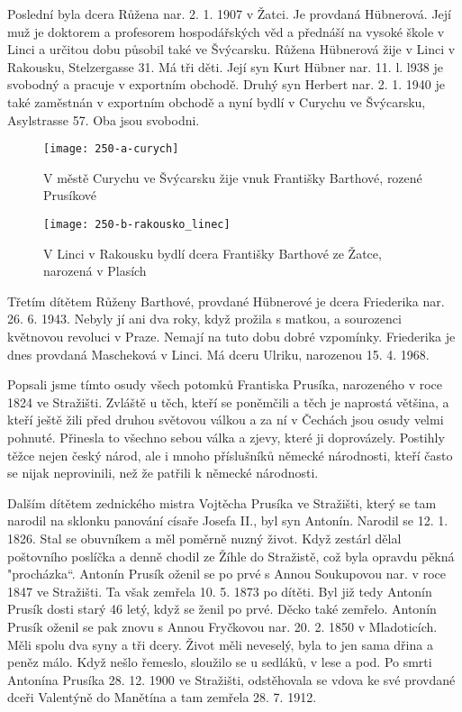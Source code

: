 \documentclass[../dejiny-rodu-prusiku.tex]{subfiles}
\begin{document}
Poslední byla dcera Růžena nar. 2. 1. 1907 v Žatci. Je provdaná Hübnerová. Její muž je doktorem a profesorem hospo­dářských věd a přednáší na vysoké škole v Linci a určitou dobu působil také ve Švýcarsku. Růžena Hübnerová žije v Linci v Rakousku, Stelzergasse 31. Má tři děti. Její syn Kurt Hübner nar. 11. l. l938 je svobodný a pracuje v exportním obchodě. Druhý syn Herbert nar. 2. 1. 1940 je také za­městnán v exportním obchodě a nyní bydlí v Curychu ve Švýcarsku, Asylstrasse 57. Oba jsou svobodni.

\begin{figure}
\centering
\texttt{[image: 250-a-curych]}
\caption{ V městě Curychu ve Švýcarsku žije vnuk Františky Barthové, rozené Prusíkové}
\label{fig:250-a-curych}
\end{figure}

             \begin{figure}
\centering
\texttt{[image: 250-b-rakousko\_linec]}
\caption{V Linci v Rakousku bydlí dcera Františky Barthové ze Žatce, narozená v Plasích}
\label{fig:250-b-rakousko_linec}
\end{figure}

Třetím dítětem Růženy Barthové, provdané Hübnerové je dcera Friederika nar. 26. 6. 1943. Nebyly jí ani dva roky, když prožila s matkou, a sourozenci květnovou revoluci v Praze. Nemají na tuto dobu dobré vzpomínky. Friederika je dnes provdaná Mascheková v Linci. Má dceru Ulriku, narozenou 15. 4. 1968.

Popsali jsme tímto osudy všech potomků Frantiska Prusíka, narozeného v roce 1824 ve Stražišti. Zvláště u těch, kteří se poněmčili a těch je naprostá většina, a kteří ještě žili před druhou světovou válkou a za ní v Čechách jsou osudy velmi pohnuté. Přinesla to všechno sebou válka a zjevy, které ji doprovázely. Postihly těžce nejen český národ, ale i mnoho příslušníků německé národnosti, kteří často se nijak neprovinili, než že patřili k německé národnosti.

Dalším dítětem zednického mistra Vojtěcha Prusíka ve Stražišti, který se tam narodil na sklonku panování císaře Josefa II., byl syn Antonín. Narodil se 12. 1. 1826. Stal se obuvníkem a měl poměrně nuzný život. Když zestárl dělal poštovního poslíčka a denně chodil ze Žíhle do Stražistě, což byla opravdu pěkná "procházka“. Antonín Prusík oženil se po prvé s Annou Soukupovou nar. v roce 1847 ve Stražišti. Ta však zemřela 10. 5. 1873 po dítěti. Byl již tedy Antonín Prusík dosti starý 46 letý, když se ženil po prvé. Děcko také zemřelo. Antonín Prusík oženil se pak znovu s Annou Fryčkovou nar. 20. 2. 1850 v Mladoticích. Měli spolu dva syny a tři dcery. Život měli neveselý, byla to jen sama dřina a peněz málo. Když nešlo řemeslo, sloužilo se u sedláků, v lese a pod. Po smrti Antonína Prusíka 28. 12. 1900 ve Stražišti, odstěhovala se vdova ke své provdané dceři Valentýně do Manětína a tam zemřela 28. 7. 1912.
\end{document}
